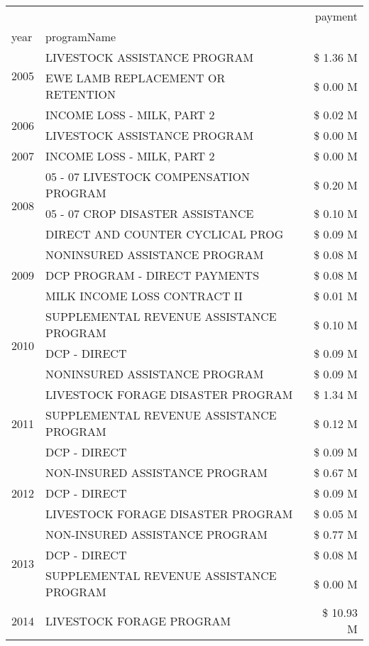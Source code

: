 \begin{tabular}{llr}
\toprule
 &  & payment \\
year & programName &  \\
\midrule
\multirow[t]{2}{*}{2005} & LIVESTOCK ASSISTANCE PROGRAM & \$ 1.36 M \\
 & EWE LAMB REPLACEMENT OR RETENTION & \$ 0.00 M \\
\cline{1-3}
\multirow[t]{2}{*}{2006} & INCOME LOSS - MILK, PART 2 & \$ 0.02 M \\
 & LIVESTOCK ASSISTANCE PROGRAM & \$ 0.00 M \\
\cline{1-3}
2007 & INCOME LOSS - MILK, PART 2 & \$ 0.00 M \\
\cline{1-3}
\multirow[t]{3}{*}{2008} & 05 - 07 LIVESTOCK COMPENSATION PROGRAM & \$ 0.20 M \\
 & 05 - 07 CROP DISASTER ASSISTANCE & \$ 0.10 M \\
 & DIRECT AND COUNTER CYCLICAL PROG & \$ 0.09 M \\
\cline{1-3}
\multirow[t]{3}{*}{2009} & NONINSURED ASSISTANCE PROGRAM & \$ 0.08 M \\
 & DCP PROGRAM - DIRECT PAYMENTS & \$ 0.08 M \\
 & MILK INCOME LOSS CONTRACT II & \$ 0.01 M \\
\cline{1-3}
\multirow[t]{3}{*}{2010} & SUPPLEMENTAL REVENUE ASSISTANCE PROGRAM & \$ 0.10 M \\
 & DCP - DIRECT & \$ 0.09 M \\
 & NONINSURED ASSISTANCE PROGRAM & \$ 0.09 M \\
\cline{1-3}
\multirow[t]{3}{*}{2011} & LIVESTOCK FORAGE DISASTER PROGRAM & \$ 1.34 M \\
 & SUPPLEMENTAL REVENUE ASSISTANCE PROGRAM & \$ 0.12 M \\
 & DCP - DIRECT & \$ 0.09 M \\
\cline{1-3}
\multirow[t]{3}{*}{2012} & NON-INSURED ASSISTANCE PROGRAM & \$ 0.67 M \\
 & DCP - DIRECT & \$ 0.09 M \\
 & LIVESTOCK FORAGE DISASTER PROGRAM & \$ 0.05 M \\
\cline{1-3}
\multirow[t]{3}{*}{2013} & NON-INSURED ASSISTANCE PROGRAM & \$ 0.77 M \\
 & DCP - DIRECT & \$ 0.08 M \\
 & SUPPLEMENTAL REVENUE ASSISTANCE PROGRAM & \$ 0.00 M \\
\cline{1-3}
\multirow[t]{3}{*}{2014} & LIVESTOCK FORAGE PROGRAM & \$ 10.93 M \\

\end{tabular}
